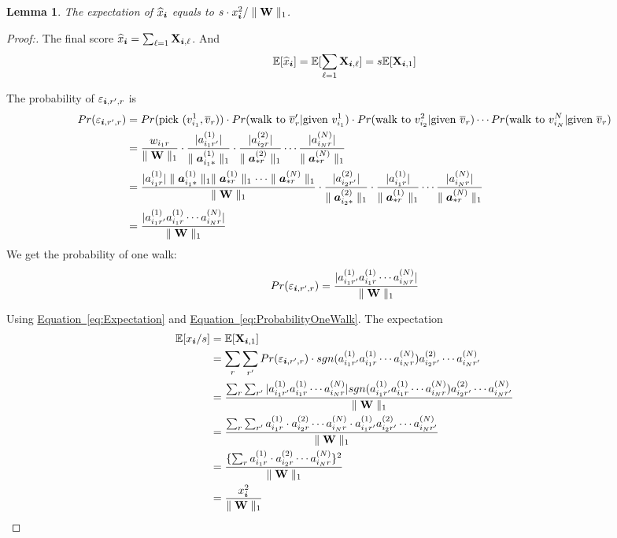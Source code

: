 \documentclass{article}
\newcommand{\Sca}[3]{{#1}^{(#2)}_{i_#2#3}}%
\newcommand{\V}[1]{{\bm{{\MakeLowercase{#1}}}}}%
\newcommand{\VnC}[3]{\V{#1}^{(#2)}_{#3}}%
\newcommand{\M}[1]{{\bm{\mathbf{\MakeUppercase{#1}}}}}%
\newcommand{\norm}[2]{\parallel#1\parallel_{#2}}
\newcommand{\Eqn}[1]{\hyperref[eq:#1]{{Equation~\ref*{eq:#1}}}}
\newtheorem{lemma}{Lemma}[section]
\begin{document}
\begin{lemma}\label{lemma:Expectation}
The expectation of $\widehat{x}_{\V{i}}$ equals to $s\cdot x^2_{\V{i}}/\norm{\M{W}}{1}$.
\end{lemma}
\begin{proof}[Proof:]
The final score $\widehat{x}_{\V{i}} = \sum_{\ell=1}\M{X}_{\V{i},\ell}$. And
\begin{equation}\label{eq:Expectation}
\mathbb{E}[\widehat{x}_{\V{i}}] = \mathbb{E}[\sum_{\ell=1}\M{X}_{\V{i},\ell}]=s\mathbb{E}[\M{X}_{\V{i},1}]
\end{equation}

The probability of $\varepsilon_{\V{i},r',r}$ is
\begin{align*}
Pr(\varepsilon_{\V{i},r',r})
& = Pr( {\rm pick\ } (v^1_{i_1},\overline{v}_r))\cdot
Pr( {\rm walk\ to\ } \overline{v}_r' | {\rm given\ }v^1_{i_1} )\cdot
Pr( {\rm walk\ to\ } v^2_{i_2} | {\rm given\ }\overline{v}_r) \cdots Pr( {\rm walk\ to\ } v^N_{i_N} | {\rm given\ }\overline{v}_r ) \\
&=\frac{w_{i_1r}}{\norm{\M{W}}{1}}\cdot
  \frac{|\Sca{a}{1}{r'}|}{\norm{{\VnC{a}{1}{i_1*}}}{1}}\cdot
  \frac{|\Sca{a}{2}{r}|}{\norm{{\VnC{a}{2}{*r}}}{1}}\cdots
  \frac{|\Sca{a}{N}{r}|}{\norm{{\VnC{a}{N}{*r}}}{1}}\\
&=\frac{    |\Sca{a}{1}{r}|\norm{{\VnC{a}{1}{i_1*}}}{1}\norm{{\VnC{a}{1}{*r}}}{1}\cdots\norm{{\VnC{a}{N}{*r}}}{1}   }{  \norm{\M{W}}{1}  }\cdot
  \frac{|\Sca{a}{2}{r'}|}{\norm{{\VnC{a}{2}{i_2*}}}{1}}\cdot
\frac{|\Sca{a}{1}{r}|}{\norm{{\VnC{a}{1}{*r}}}{1}}\cdots
  \frac{|\Sca{a}{N}{r}|}{\norm{{\VnC{a}{N}{*r}}}{1}}\\
&=\frac{    |\Sca{a}{1}{r'}\Sca{a}{1}{r}\cdots\Sca{a}{N}{r}|    }{\norm{\M{W}}{1}}
\end{align*}
We get the probability of one walk:
\begin{equation}\label{eq:ProbabilityOneWalk}
Pr(\varepsilon_{\V{i},r',r})=\frac{|\Sca{a}{1}{r'}\Sca{a}{1}{r}\cdots\Sca{a}{N}{r}|}{\norm{\M{W}}{1}}
\end{equation}

Using \Eqn{Expectation} and \Eqn{ProbabilityOneWalk}. The expectation
\begin{align*}
\mathbb{E}[x_{\V{i}}/s]
&= \mathbb{E}[\M{X}_{\V{i},1}]\\
&=\sum_{r}\sum_{r'}Pr(\varepsilon_{\V{i},r',r})\cdot sgn(\Sca{a}{1}{r'}\Sca{a}{1}{r}\cdots\Sca{a}{N}{r})
\Sca{a}{2}{r'}\cdots\Sca{a}{N}{r'}\\
&=\frac{\sum_{r}\sum_{r'}|\Sca{a}{1}{r'}\Sca{a}{1}{r}\cdots\Sca{a}{N}{r}|sgn(\Sca{a}{1}{r'}\Sca{a}{1}{r}\cdots\Sca{a}{N}{r})
\Sca{a}{2}{r'}\cdots\Sca{a}{N}{r'}}{\norm{\M{W}}{1}}\\
&=\frac{\sum_{r}\sum_{r'} \Sca{a}{1}{r}\cdot\Sca{a}{2}{r}\cdots\Sca{a}{N}{r}\cdot\Sca{a}{1}{r'} \Sca{a}{2}{r'}\cdots\Sca{a}{N}{r'}}{\norm{\M{W}}{1}} \\
&=\frac{\{\sum_{r}\Sca{a}{1}{r}\cdot\Sca{a}{2}{r}\cdots\Sca{a}{N}{r}\}^2}{\norm{\M{W}}{1}}\\
&=\frac{x_{\V{i}}^2}{\norm{\M{W}}{1}}
\end{align*}
\end{proof}
\end{document}
